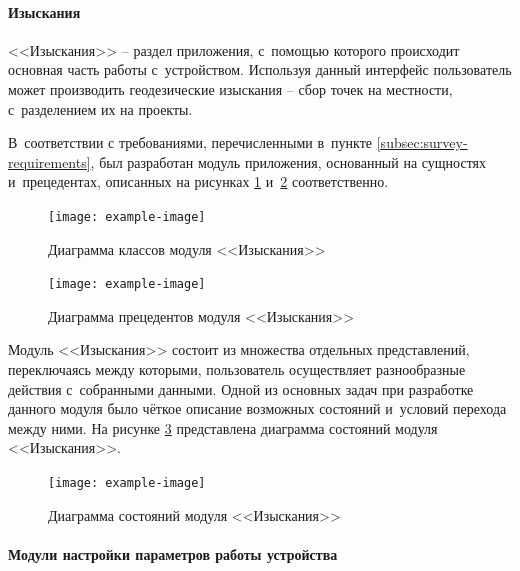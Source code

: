 \paragraph{Изыскания}

<<Изыскания>> -- раздел приложения, с~помощью которого происходит основная часть работы с~устройством. Используя данный интерфейс пользователь может производить геодезические изыскания -- сбор точек на местности, с~разделением их на проекты.

В~соответствии с требованиями, перечисленными в~пункте \ref{subsec:survey-requirements}, был разработан модуль приложения, основанный на сущностях и~прецедентах, описанных на рисунках \ref{fig:survey-uml-classes} и~\ref{fig:survey-uml-usecase} соответственно.

\begin{figure}[h!]
  \centering
  \setlength{\fboxsep}{5pt}
  \texttt{[image: example-image]}
  \vspace*{6pt}
  \caption{Диаграмма классов модуля <<Изыскания>>}
  \label{fig:survey-uml-classes}
\end{figure}

\begin{figure}[h!]
  \centering
  \setlength{\fboxsep}{5pt}
  \texttt{[image: example-image]}
  \vspace*{6pt}
  \caption{Диаграмма прецедентов модуля <<Изыскания>>}
  \label{fig:survey-uml-usecase}
\end{figure}

Модуль <<Изыскания>> состоит из множества отдельных представлений, переключаясь между которыми, пользователь осуществляет разнообразные действия с~собранными данными. Одной из основных задач при разработке данного модуля было чёткое описание возможных состояний и~условий перехода между ними. На рисунке \ref{fig:survey-uml-state} представлена диаграмма состояний модуля <<Изыскания>>.

\begin{figure}[h!]
  \centering
  \setlength{\fboxsep}{5pt}
  \texttt{[image: example-image]}
  \vspace*{6pt}
  \caption{Диаграмма состояний модуля <<Изыскания>>}
  \label{fig:survey-uml-state}
\end{figure}

\paragraph{Модули настройки параметров работы устройства}
\label{subsec:device-settings}

